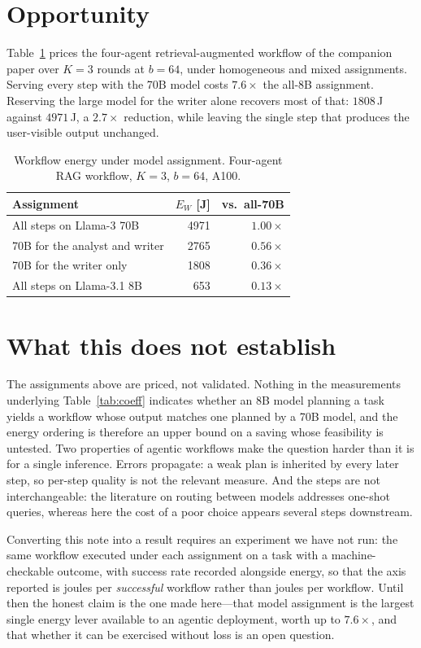 \documentclass[journal]{IEEEtran}
\begin{document}
\section{Opportunity}
Table~\ref{tab:assign} prices the four-agent retrieval-augmented workflow of the companion paper
over $K=3$ rounds at $b=64$, under homogeneous and mixed assignments. Serving every step with the
70B model costs $7.6\times$ the all-8B assignment. Reserving the large model for the writer alone
recovers most of that: $1808$\,J against $4971$\,J, a $2.7\times$ reduction, while leaving the
single step that produces the user-visible output unchanged.

\begin{table}[t]
\caption{Workflow energy under model assignment. Four-agent RAG workflow, $K=3$, $b=64$, A100.}
\label{tab:assign}
\centering
\small
\begin{tabular}{@{}lrr@{}}
\toprule
Assignment & $E_W$ [J] & vs.\ all-70B \\
\midrule
All steps on Llama-3 70B                     & 4971 & $1.00\times$ \\
70B for the analyst and writer               & 2765 & $0.56\times$ \\
70B for the writer only                      & 1808 & $0.36\times$ \\
All steps on Llama-3.1 8B                    &  653 & $0.13\times$ \\
\bottomrule
\end{tabular}
\end{table}

\section{What this does not establish}
The assignments above are priced, not validated. Nothing in the measurements underlying
Table~\ref{tab:coeff} indicates whether an 8B model planning a task yields a workflow whose output
matches one planned by a 70B model, and the energy ordering is therefore an upper bound on a
saving whose feasibility is untested. Two properties of agentic workflows make the question harder
than it is for a single inference. Errors propagate: a weak plan is inherited by every later step,
so per-step quality is not the relevant measure. And the steps are not interchangeable: the
literature on routing between models addresses one-shot queries, whereas here the cost of a poor
choice appears several steps downstream.

Converting this note into a result requires an experiment we have not run: the same workflow
executed under each assignment on a task with a machine-checkable outcome, with success rate
recorded alongside energy, so that the axis reported is joules per \emph{successful} workflow
rather than joules per workflow. Until then the honest claim is the one made here---that model
assignment is the largest single energy lever available to an agentic deployment, worth up to
$7.6\times$, and that whether it can be exercised without loss is an open question.
\end{document}
